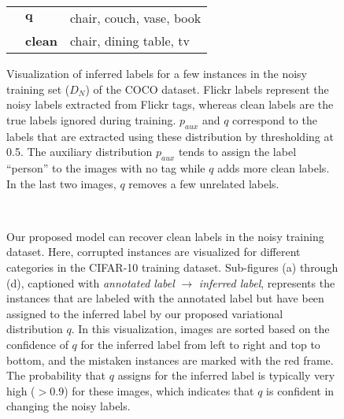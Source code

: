 \documentclass{article}
\begin{document}
\begin{figure}
\begin{tabular}{c l l}
  & $\pmb{q}$       & chair, couch, vase, book \\[0.6ex]
  & \textbf{clean}  & chair, dining table, tv  \\[1.1ex] 
\end{tabular}
\caption{Visualization of inferred labels for a few instances in the noisy training set ($D_N$) of the COCO dataset. Flickr labels represent the noisy labels extracted from
Flickr tags, whereas 
clean labels are the true labels ignored during training. $p_{aux}$ and $q$ correspond to the labels that are extracted using 
these distribution by thresholding at 0.5. The auxiliary distribution $p_{aux}$ tends to assign the label ``person'' to the images with no tag while $q$ adds more clean labels. 
In the last two images, $q$ removes a few unrelated labels.
}
\label{fig:coco_res}
\end{figure}

\begin{figure}
 \centering
  \hspace{0.5cm}
  \\
  \hspace{0.5cm}
  \caption{Our proposed model can recover clean labels in the noisy training dataset. Here, corrupted instances are visualized for different categories in the CIFAR-10 training dataset.
  Sub-figures (a) through (d), captioned with \textit{annotated label} $\rightarrow$ \textit{inferred label}, represents the instances that are labeled with the annotated label
  but have been assigned to the inferred label by our proposed variational distribution $q$. In this visualization, images are sorted based on the confidence of $q$
  for the inferred label from left to right and top to bottom, and the mistaken instances are marked with the red frame. The probability that $q$ assigns for the inferred
  label is typically very high ($>0.9$) for these images, which indicates that $q$ is confident in changing the noisy labels.}
  \label{fig:cifar_res}
\end{figure}
\end{document}
